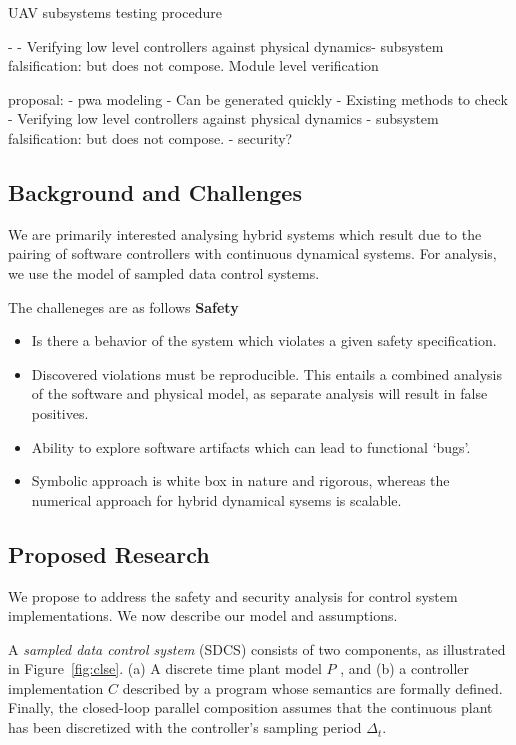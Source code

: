UAV subsystems testing procedure

-
- Verifying low level controllers against physical dynamics- subsystem
falsification: but does not compose. Module level verification

proposal:
    - pwa modeling
        - Can be generated quickly
        - Existing methods to check
    - Verifying low level controllers against physical dynamics -
      subsystem falsification: but does not compose.
    - security?


\subsection{Background and Challenges}

We are primarily interested analysing hybrid systems which result due
to the pairing of software controllers with continuous dynamical
systems. For analysis, we use the model of sampled data control
systems.

The challeneges are as follows
\textbf{Safety}
\begin{itemize}
    \item Is there a behavior of the system which violates a given
        safety specification.
    \item Discovered violations must be reproducible. This entails a
        combined analysis of the software and physical model, as
        separate analysis will result in false positives.
    \item Ability to explore software artifacts which can lead to
        functional `bugs'.
    \item Symbolic approach is white box in nature and rigorous,
        whereas the numerical approach for hybrid dynamical sysems is
        scalable.
\end{itemize}

\subsection{Proposed Research}

We propose to address the safety and security analysis for control
system implementations. We now describe our model and assumptions.



A \emph{sampled data control system} (SDCS) consists of two
components, as illustrated in Figure~\ref{fig:clse}. (a) A
discrete time plant model $P$
, and (b) a controller implementation
$C$ described by a program whose semantics are formally defined.
Finally, the closed-loop parallel composition assumes that the
continuous plant has been discretized with the controller's sampling
period $\Delta_t$.



